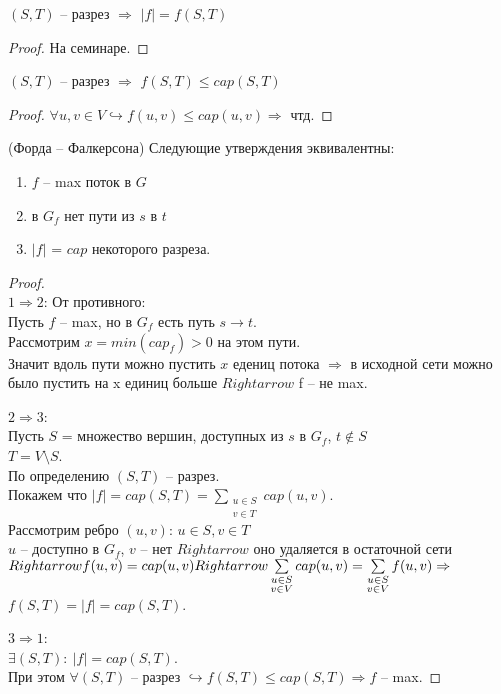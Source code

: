 \begin{lemma}
	$(S, T)$ -- разрез $\Rightarrow$ $\lvert f \rvert = f(S, T)$
\end{lemma}

\begin{proof}
	На семинаре.	
\end{proof}

\begin{lemma}
	$(S, T)$ -- разрез $\Rightarrow$ $f(S, T) \leq cap(S, T)$
\end{lemma}

\begin{proof}
	$\forall u, v \in V \hookrightarrow f(u, v) \leq cap(u, v) \Rightarrow$ чтд.
\end{proof}

\begin{theorem} (Форда -- Фалкерсона)
	Следующие утверждения эквивалентны:
	\begin{enumerate}
		\item $f$ -- max поток в $G$  
		\item в $G_f$ нет пути из  $s$ в  $t$
		\item $\lvert f \rvert$  = $cap$ некоторого разреза.
	\end{enumerate}
\end{theorem}

\begin{proof} \ \\
	$1 \Rightarrow 2$: От противного: \\
		Пусть  $f$ -- max, но в  $G_f$ есть путь  $s \rightarrow t$. \\
		Рассмотрим  $x = min(cap_f) > 0$ на этом пути. \\
		Значит вдоль пути можно пустить  $x$ едениц потока  $\Rightarrow$ в исходной сети можно было пустить на x единиц больше $Rightarrow$ f -- не  max. 

	$2 \Rightarrow 3$: \\
		Пусть $S$ = множество вершин, доступных из  $s$ в  $G_f$,  $t \notin S$ \\
		$T = V \setminus S$. \\
		По определению $(S, T)$ -- разрез. \\
		Покажем что $\lvert f \rvert = cap(S, T) = \sum\limits_{\substack{u \in S \\ v \in T}} cap(u, v)$. \\
		Рассмотрим ребро $(u, v)$: $u \in S, v \in T$ \\
		$u$ -- доступно в  $G_f$,  $v$ -- нет  $Rightarrow$ оно удаляется в остаточной сети $Rightarrow \\
		f(u, v) = cap(u, v) Rightarrow \sum\limits_{\substack{u \in S \\ v \in V}} cap(u, v) = \sum\limits_{\substack{u \in S \\ v \in V}} f(u, v) \Rightarrow$ \\
		$f(S, T) = \lvert f \rvert = cap(S, T)$. 

	$3 \Rightarrow 1$: \\
	$\exists (S, T):\ \lvert f \rvert = cap(S, T)$. \\
	При этом $\forall (S, T)$ -- разрез $\hookrightarrow f(S, T) \leq cap(S, T) \Rightarrow f$  -- max. 
\end{proof}

